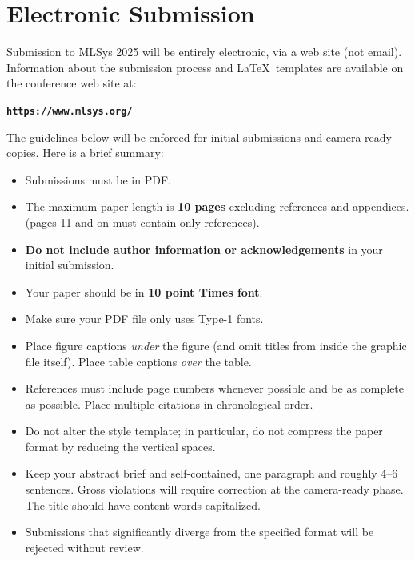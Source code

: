 \documentclass{article}
\begin{document}


\printAffiliationsAndNotice{\mlsysEqualContribution} %



\section{Electronic Submission}
\label{submission}

Submission to MLSys 2025 will be entirely electronic, via a web site
(not email). Information about the submission process and \LaTeX\ templates
are available on the conference web site at:
\begin{center}
\textbf{\texttt{https://www.mlsys.org/}}
\end{center}

The guidelines below will be enforced for initial submissions and
camera-ready copies. Here is a brief summary:
\begin{itemize}
\item Submissions must be in PDF\@.
\item The maximum paper length is \textbf{10 pages} excluding references and appendices.
    (pages 11 and on must contain only references).
\item \textbf{Do not include author information or acknowledgements} in your
    initial submission.
\item Your paper should be in \textbf{10 point Times font}.
\item Make sure your PDF file only uses Type-1 fonts.
\item Place figure captions \emph{under} the figure (and omit titles from inside
    the graphic file itself). Place table captions \emph{over} the table.
\item References must include page numbers whenever possible and be as complete
    as possible. Place multiple citations in chronological order.
\item Do not alter the style template; in particular, do not compress the paper
    format by reducing the vertical spaces.
\item Keep your abstract brief and self-contained, one paragraph and roughly
    4--6 sentences. Gross violations will require correction at the
    camera-ready phase. The title should have content words capitalized.
\item Submissions that significantly diverge from the specified format 
    will be rejected without review.
\end{itemize}
\end{document}
